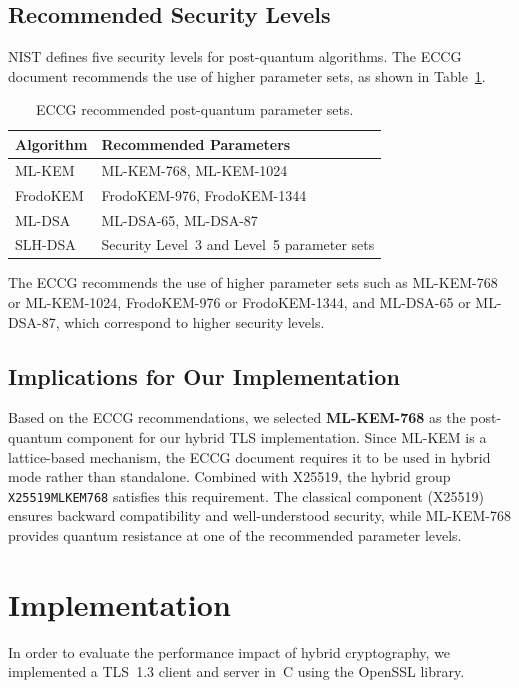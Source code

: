 \documentclass[11pt,a4paper]{article}
\begin{document}
\subsection{Recommended Security Levels}

NIST defines five security levels for post-quantum algorithms. The ECCG document recommends the use of higher parameter sets, as shown in Table~\ref{tab:enisa-levels}.

\begin{table}[h]
\centering
\begin{tabular}{ll}
\toprule
\textbf{Algorithm} & \textbf{Recommended Parameters} \\
\midrule
ML-KEM  & ML-KEM-768, ML-KEM-1024 \\
FrodoKEM & FrodoKEM-976, FrodoKEM-1344 \\
ML-DSA  & ML-DSA-65, ML-DSA-87 \\
SLH-DSA & Security Level~3 and Level~5 parameter sets \\
\bottomrule
\end{tabular}
\caption{ECCG recommended post-quantum parameter sets.}
\label{tab:enisa-levels}
\end{table}

The ECCG recommends the use of higher parameter sets such as ML-KEM-768 or ML-KEM-1024, FrodoKEM-976 or FrodoKEM-1344, and ML-DSA-65 or ML-DSA-87, which correspond to higher security levels.

\subsection{Implications for Our Implementation}

Based on the ECCG recommendations, we selected \textbf{ML-KEM-768} as the post-quantum component for our hybrid TLS implementation. Since ML-KEM is a lattice-based mechanism, the ECCG document requires it to be used in hybrid mode rather than standalone. Combined with X25519, the hybrid group \texttt{X25519MLKEM768} satisfies this requirement. The classical component (X25519) ensures backward compatibility and well-understood security, while ML-KEM-768 provides quantum resistance at one of the recommended parameter levels.

\section{Implementation}

In order to evaluate the performance impact of hybrid cryptography, we implemented a TLS~1.3 client and server in~C using the OpenSSL library.
\end{document}

